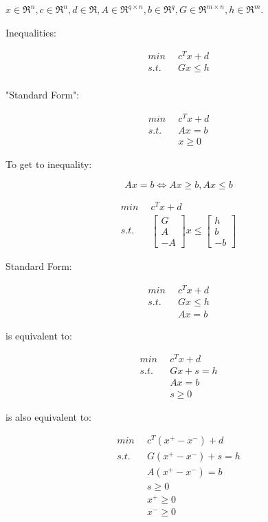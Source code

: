 $x\in \Re^n, c\in \Re^n, d\in \Re, A\in \Re^{q\times n}, b\in \Re^q, G\in \Re^{m\times n}, h\in \Re^m$.

Inequalities:

\begin{align*}
min \,\,\, &c^Tx+d\\
s.t. \,\,\, &Gx\leq h\\
\end{align*}

"Standard Form":

\begin{align*}
min \,\,\, &c^Tx+d\\
s.t. \,\,\, &Ax = b\\
&x\geq 0
\end{align*}

To get to inequality:

\begin{equation*}
Ax = b \Leftrightarrow Ax\geq b, Ax\leq b
\end{equation*}

\begin{align*}
min\,\,\, &c^Tx +d\\
s.t. &\begin{bmatrix}
G\\
A\\
-A
\end{bmatrix} x\leq
\begin{bmatrix}
h\\
b\\
-b
\end{bmatrix}
\end{align*}

Standard Form:

\begin{align*}
min \,\,\, &c^Tx+d\\
s.t. \,\,\, &Gx\leq h\\
&Ax = b
\end{align*}

is equivalent to:

\begin{align*}
min \,\,\, &c^Tx+d\\
s.t. \,\,\, &Gx + s = h\\
&Ax = b\\
&s\geq 0
\end{align*}

is also equivalent to:

\begin{align*}
min \,\,\, &c^T(x^{+} - x^{-})+d\\
s.t. \,\,\, &G(x^{+} - x^{-}) + s = h\\
&A(x^{+} - x^{-}) = b\\
&s\geq 0\\
&x^{+}\geq 0\\
&x^{-}\geq 0
\end{align*}

